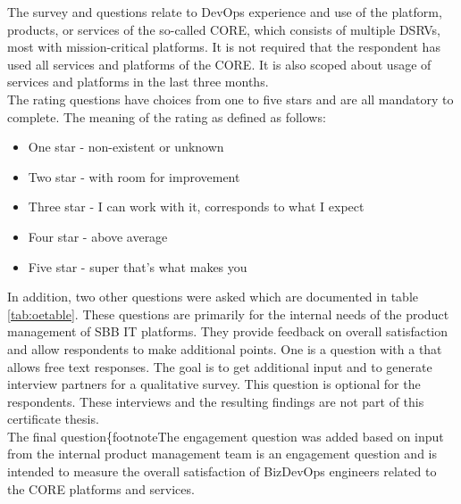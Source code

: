 \documentclass[a4paper,12pt]{article}
\begin{document}
    The survey and questions relate to DevOps experience and use of the platform, products, or services of the so-called CORE,
    which consists of multiple DSRVs, most with mission-critical platforms.
    It is not required that the respondent has used all services and platforms of the CORE.
    It is also scoped about usage of services and platforms in the last three months.\\
    The rating questions have choices from one to five stars and are all mandatory to complete.
    The meaning of the rating as defined as follows:
    \begin{itemize}
        \item One star - non-existent or unknown
        \item Two star - with room for improvement
        \item Three star - I can work with it, corresponds to what I expect
        \item Four star - above average
        \item Five star - super that's what makes you
    \end{itemize}

    In addition, two other questions were asked which are documented in table \ref{tab:oetable}.
    These questions are primarily for the internal needs of the product management of SBB IT platforms.
    They provide feedback on overall satisfaction and allow respondents to make additional points.
    One is a question with a that allows free text responses.
    The goal is to get additional input and to generate interview partners for a qualitative survey.
    This question is optional for the respondents.
    These interviews and the resulting findings are not part of this certificate thesis.\\
    The final question\{footnote{The engagement question was added based on input from the internal product management team}
    is an engagement question and is intended to measure the overall satisfaction of BizDevOps engineers related to the CORE platforms and services.
\end{document}
